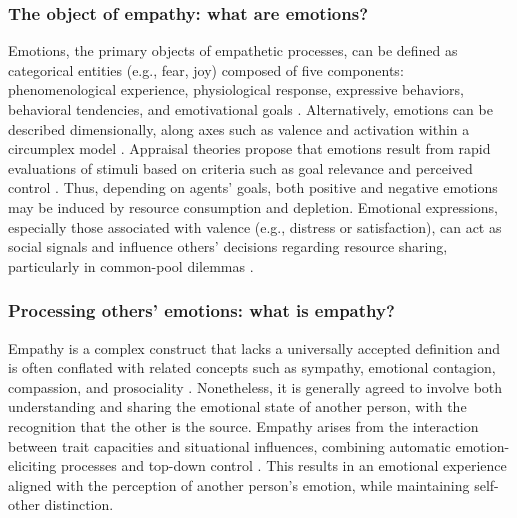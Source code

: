\subsubsection{The object of empathy: what are emotions?}
Emotions, the primary objects of empathetic processes, can be defined as categorical entities (e.g., fear, joy) composed of five components: phenomenological experience, physiological response, expressive behaviors, behavioral tendencies, and emotivational goals \cite{rosemanEmotionalBehaviorsEmotivational2011}. Alternatively, emotions can be described dimensionally, along axes such as valence and activation within a circumplex model \cite{russellCoreAffectPsychological2003,rosemanEmotionalBehaviorsEmotivational2011}. Appraisal theories propose that emotions result from rapid evaluations of stimuli based on criteria such as goal relevance and perceived control \cite{broschCommentAppraisingBrain2013,moorsPowerGoalDirectedProcesses2017}. Thus, depending on agents’ goals, both positive and negative emotions may be induced by resource consumption and depletion. Emotional expressions, especially those associated with valence (e.g., distress or satisfaction), can act as social signals and influence others' decisions regarding resource sharing, particularly in common-pool dilemmas \cite{lynneTheoreticalFoundationEmpathy2016}.

\subsubsection{Processing others’ emotions: what is empathy?}
Empathy is a complex construct that lacks a universally accepted definition and is often conflated with related concepts such as sympathy, emotional contagion, compassion, and prosociality \cite{cuffEmpathyReviewConcept2016}. Nonetheless, it is generally agreed to involve both understanding and sharing the emotional state of another person, with the recognition that the other is the source. Empathy arises from the interaction between trait capacities and situational influences, combining automatic emotion-eliciting processes and top-down control \cite{cuffEmpathyReviewConcept2016}. This results in an emotional experience aligned with the perception of another person's emotion, while maintaining self-other distinction.

